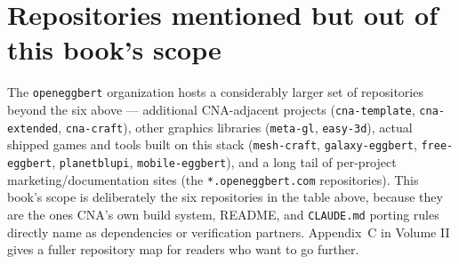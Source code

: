 \section{Repositories mentioned but out of this book's scope}

The \texttt{openeggbert} organization hosts a considerably larger set of repositories beyond
the six above --- additional CNA-adjacent projects (\texttt{cna-template}, \texttt{cna-extended},
\texttt{cna-craft}), other graphics libraries (\texttt{meta-gl}, \texttt{easy-3d}), actual
shipped games and tools built on this stack (\texttt{mesh-craft}, \texttt{galaxy-eggbert},
\texttt{free-eggbert}, \texttt{planetblupi}, \texttt{mobile-eggbert}), and a long tail of
per-project marketing/documentation sites (the \texttt{*.openeggbert.com} repositories). This
book's scope is deliberately the six repositories in the table above, because they are the
ones CNA's own build system, README, and \texttt{CLAUDE.md} porting rules directly name as
dependencies or verification partners. Appendix~C in Volume II gives a fuller repository map
for readers who want to go further.
